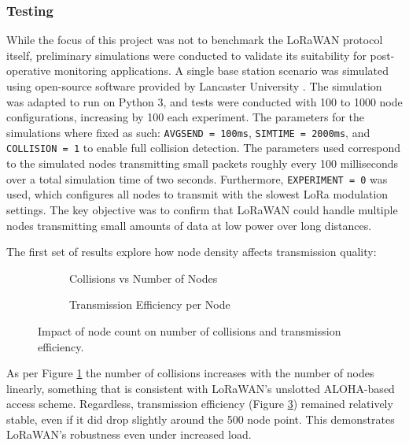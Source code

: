 \subsubsection{Testing}
While the focus of this project was not to benchmark the LoRaWAN protocol itself, preliminary simulations were conducted to validate its suitability for post-operative monitoring applications. A single base station scenario was simulated using open-source software provided by Lancaster University \cite{lancaster_uk_simulation_software}. The simulation was adapted to run on Python 3, and tests were conducted with 100 to 1000 node configurations, increasing by 100 each experiment. The parameters for the simulations where fixed as such: \texttt{AVGSEND = 100ms}, \texttt{SIMTIME = 2000ms}, and \texttt{COLLISION = 1} to enable full collision detection. The parameters used correspond to the simulated nodes transmitting small packets roughly every 100 milliseconds over a total simulation time of two seconds. Furthermore, \texttt{EXPERIMENT = 0} was used, which configures all nodes to transmit with the slowest LoRa modulation settings. The key objective was to confirm that LoRaWAN could handle multiple nodes transmitting small amounts of data at low power over long distances.

\vspace{1em} \noindent The first set of results explore how node density affects transmission quality:
\begin{figure}[H]
\centering
\begin{subfigure}{0.48\textwidth}
	\centering
	
	\caption{Collisions vs Number of Nodes}
	\label{fig:collisions_vs_nodes}
\end{subfigure}
\hfill
\begin{subfigure}{0.48\textwidth}
	\centering
	
	\caption{Transmission Efficiency per Node}
	\label{fig:efficiency_vs_nodes}
\end{subfigure}
\caption{Impact of node count on number of collisions and transmission efficiency.}
\end{figure}

As per Figure \ref{fig:collisions_vs_nodes} the number of collisions increases with the number of nodes linearly, something that is consistent with LoRaWAN's unslotted ALOHA-based access scheme. Regardless, transmission efficiency (Figure \ref{fig:efficiency_vs_nodes}) remained relatively stable, even if it did drop slightly around the 500 node point. This demonstrates LoRaWAN's robustness even under increased load.

